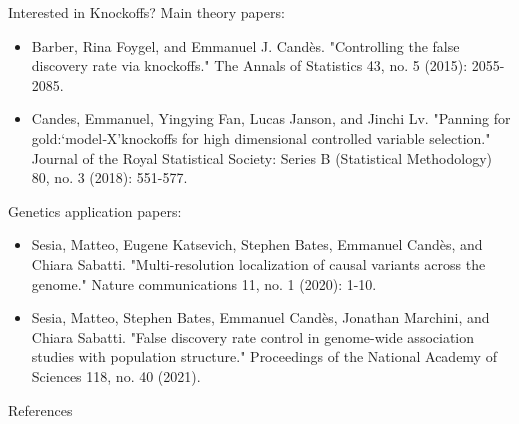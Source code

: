 \documentclass[aspectratio=169, 10pt]{beamer}
\begin{document}
\begin{frame}{Interested in Knockoffs?}
Main theory papers:
\begin{itemize}
    \item Barber, Rina Foygel, and Emmanuel J. Candès. "Controlling the false discovery rate via knockoffs." The Annals of Statistics 43, no. 5 (2015): 2055-2085.
    \item Candes, Emmanuel, Yingying Fan, Lucas Janson, and Jinchi Lv. "Panning for gold:‘model‐X’knockoffs for high dimensional controlled variable selection." Journal of the Royal Statistical Society: Series B (Statistical Methodology) 80, no. 3 (2018): 551-577.
\end{itemize}
Genetics application papers:
\begin{itemize}
    \item Sesia, Matteo, Eugene Katsevich, Stephen Bates, Emmanuel Candès, and Chiara Sabatti. "Multi-resolution localization of causal variants across the genome." Nature communications 11, no. 1 (2020): 1-10.
    \item Sesia, Matteo, Stephen Bates, Emmanuel Candès, Jonathan Marchini, and Chiara Sabatti. "False discovery rate control in genome-wide association studies with population structure." Proceedings of the National Academy of Sciences 118, no. 40 (2021).
\end{itemize}
\end{frame}


References
\footnotesize


\end{document}
